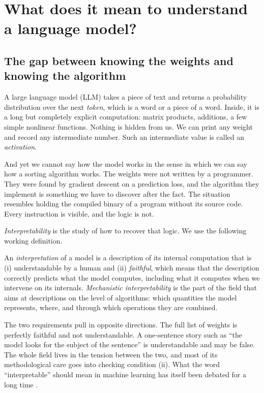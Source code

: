 \section{What does it mean to understand a language model?}
\label{sec:intro}

\subsection{The gap between knowing the weights and knowing the algorithm}

A large language model (LLM) takes a piece of text and returns a probability distribution over the next
\emph{token}, which is a word or a piece of a word.
Inside, it is a long but completely explicit computation: matrix products, additions, a few simple nonlinear
functions. Nothing is hidden from us. We can print any weight and record any intermediate number. Such an
intermediate value is called an \emph{activation}.

And yet we cannot say how the model works in the sense in which we can say how a sorting algorithm works. The
weights were not written by a programmer. They were found by gradient descent on a prediction loss, and the
algorithm they implement is something we have to discover after the fact. The situation resembles holding the
compiled binary of a program without its source code. Every instruction is visible, and the logic is not.

\emph{Interpretability} is the study of how to recover that logic. We use the following working definition.

\begin{definition}[Interpretability]\label{def:interp}
An \emph{interpretation} of a model is a description of its internal computation that is (i) understandable by
a human and (ii) \emph{faithful}, which means that the description correctly predicts what the model computes,
including what it computes when we intervene on its internals.
\emph{Mechanistic interpretability} is the part of the field that aims at descriptions on the level of
algorithms: which quantities the model represents, where, and through which operations they are combined.
\end{definition}

The two requirements pull in opposite directions. The full list of weights is perfectly faithful and not
understandable. A one-sentence story such as ``the model looks for the subject of the sentence'' is understandable
and may be false. The whole field lives in the tension between the two, and most of its methodological care goes
into checking condition (ii). What the word ``interpretable'' should mean in machine learning has itself been
debated for a long time \citep{lipton2018mythos,doshivelez2017towards}.

